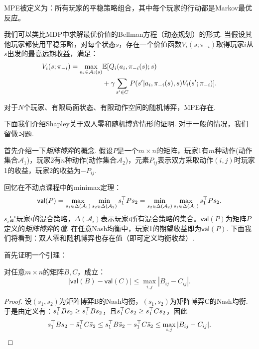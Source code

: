 MPE被定义为：所有玩家的平稳策略组合，其中每个玩家的行动都是Markov最优反应。

我们可以类比MDP中求解最优价值的Bellman方程（动态规划）的形式. 当假设其他玩家都使用平稳策略，对每个状态$s$，存在一个价值函数$V_i(s;\pi_{-i})$取得玩家$i$从$s$出发的最高远期收益，满足：
\begin{align*}
    V_i(s;\pi_{-i}) = \max_{a_i\in \mathcal A_i(s)}&\mathbb{E}[Q_i(a_i,\pi_{-i}(s);s) \\ &+ \gamma \sum_{s'\in C}P(s'|a_i,\pi_{-i}(s),s)V_i(s';\pi_{-i})].
\end{align*}

\begin{theorem}
    对于$N$个玩家、有限局面状态、有限动作空间的随机博弈，MPE存在.
\end{theorem}

下面我们介绍Shapley关于双人零和随机博弈情形的证明. 对于一般的情况，我们留做习题.

\newcommand{\val}{\mathsf{val}}
首先介绍一下\emph{矩阵博弈}的概念. 假设$P$是一个$m\times n$的矩阵，玩家1有$m$种动作(动作集合$\mathcal A_1$)，玩家2有$n$种动作(动作集合$\mathcal A_2$)，元素$P_{ij}$表示双方采取动作$(i,j)$时玩家1的收益，玩家2的收益为$-P_{ij}$. 

回忆在不动点课程中的minimax定理：
\[\val(P)=\max_{s_1\in \Delta(\mathcal A_1)}\min_{s_2\in\Delta(\mathcal A_2)}s_1^\T Ps_2=\min_{s_2\in \Delta(\mathcal A_2)}\max_{s_1\in\Delta(\mathcal A_1)}s_1^\T Ps_2.\]
$s_i$是玩家$i$的混合策略，$\Delta(\mathcal A_i)$表示玩家$i$所有混合策略的集合。$\val(P)$为矩阵$P$定义的\emph{矩阵博弈}的\emph{值}. 在任意Nash均衡中，玩家1的期望收益即为$\val(P)$. 下面我们将看到：双人零和随机博弈也存在值（即可定义均衡收益）.

首先证明一个引理：
\begin{lemma}\label{lemma:matrix}
    对任意$m\times n$的矩阵$B,C$，成立：
    \[|\val(B)-\val(C)| \le \max_{i,j}|B_{ij} - C_{ij}|.\]
\end{lemma}

\begin{proof}
    设$(s_1,s_2)$为矩阵博弈B的Nash均衡，$(\bar{s}_1,\bar{s}_2)$为矩阵博弈C的Nash均衡. 于是由定义有：$s_1^\top B\bar{s}_2  \ge s_1^\top  B s_2$，且$\bar{s}_1 ^\top  C\bar{s}_2 \ge s_1^\top  C \bar{s}_2 $，因此
    \[s_1^\top  B s_2 - \bar{s}_1 ^\top  C\bar{s}_2  \le s_1^\top  B\bar{s}_2  - s_1^\top  C \bar{s}_2  \le \max_{i,j}|B_{ij} - C_{ij}|.\]
\end{proof}

